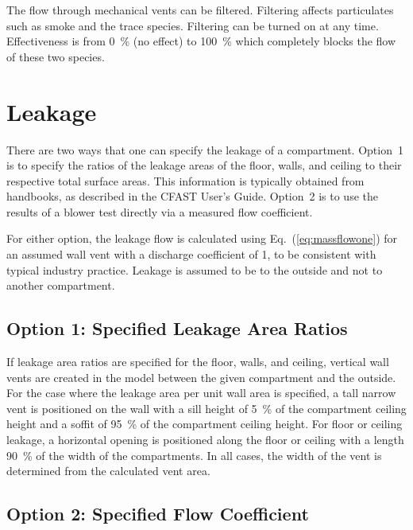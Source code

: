 \documentclass[12pt,twoside]{book}
\begin{document}
The flow through mechanical vents can be filtered. Filtering affects particulates such as smoke and the trace species. Filtering can be turned on at any time. Effectiveness is from 0~\% (no effect) to 100~\% which completely blocks the flow of these two species.

\section{Leakage}

There are two ways that one can specify the leakage of a compartment. Option~1 is to specify the ratios of the leakage areas of the floor, walls, and ceiling to their respective total surface areas. This information is typically obtained from handbooks, as described in the CFAST User's Guide. Option~2 is to use the results of a blower test directly via a measured flow coefficient.

For either option, the leakage flow is calculated using Eq.~(\ref{eq:massflowone}) for an assumed wall vent with a discharge coefficient of 1, to be consistent with typical industry practice. Leakage is assumed to be to the outside and not to another compartment.

\subsection{Option 1: Specified Leakage Area Ratios}

If leakage area ratios are specified for the floor, walls, and ceiling, vertical wall vents are created in the model between the given compartment and the outside. For the case where the leakage area per unit wall area is specified, a tall narrow vent is positioned on the wall with a sill height of 5~\% of the compartment ceiling height and a soffit of 95~\% of the compartment ceiling height. For floor or ceiling leakage, a horizontal opening is positioned along the floor or ceiling with a length 90~\% of the width of the compartments. In all cases, the width of the vent is determined from the calculated vent area.


\subsection{Option 2: Specified Flow Coefficient}
\end{document}
